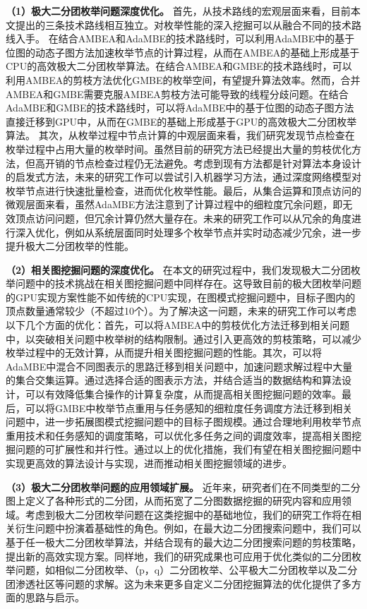 \textbf{（1）极大二分团枚举问题深度优化。} 首先，从技术路线的宏观层面来看，目前本文提出的三条技术路线相互独立。对枚举性能的深入挖掘可以从融合不同的技术路线入手。
在结合AMBEA和AdaMBE的技术路线时，可以利用AdaMBE中的基于位图的动态子图方法加速枚举节点的计算过程，从而在AMBEA的基础上形成基于CPU的高效极大二分团枚举算法。在结合AMBEA和GMBE的技术路线时，可以利用AMBEA的剪枝方法优化GMBE的枚举空间，有望提升算法效率。然而，合并AMBEA和GMBE需要克服AMBEA剪枝方法可能导致的线程分歧问题。在结合AdaMBE和GMBE的技术路线时，可以将AdaMBE中的基于位图的动态子图方法直接迁移到GPU中，从而在GMBE的基础上形成基于GPU的高效极大二分团枚举算法。
其次，从枚举过程中节点计算的中观层面来看，我们研究发现节点检查在枚举过程中占用大量的枚举时间。虽然目前的研究方法已经提出大量的剪枝优化方法，但高开销的节点检查过程仍无法避免。考虑到现有方法都是针对算法本身设计的启发式方法，未来的研究工作可以尝试引入机器学习方法，通过深度网络模型对枚举节点进行快速批量检查，进而优化枚举性能。最后，从集合运算和顶点访问的微观层面来看，虽然AdaMBE方法注意到了计算过程中的细粒度冗余问题，即无效顶点访问问题，但冗余计算仍然大量存在。未来的研究工作可以从冗余的角度进行深入优化，例如从系统层面同时处理多个枚举节点并实时动态减少冗余，进一步提升极大二分团枚举的性能。


\textbf{（2）相关图挖掘问题的深度优化。} 在本文的研究过程中，我们发现极大二分团枚举问题中的技术挑战在相关图挖掘问题中同样存在。这导致目前的极大团枚举问题的GPU实现方案性能不如传统的CPU实现，在图模式挖掘问题中，目标子图内的顶点数量通常较少（不超过10个）。为了解决这一问题，未来的研究工作可以考虑以下几个方面的优化：首先，可以将AMBEA中的剪枝优化方法迁移到相关问题中，以突破相关问题中枚举树的结构限制。通过引入更高效的剪枝策略，可以减少枚举过程中的无效计算，从而提升相关图挖掘问题的性能。其次，可以将AdaMBE中混合不同图表示的思路迁移到相关问题中，加速问题求解过程中大量的集合交集运算。通过选择合适的图表示方法，并结合适当的数据结构和算法设计，可以有效降低集合操作的计算复杂度，从而提高相关图挖掘问题的效率。最后，可以将GMBE中枚举节点重用与任务感知的细粒度任务调度方法迁移到相关问题中，进一步拓展图模式挖掘问题中的目标子图规模。通过合理地利用枚举节点重用技术和任务感知的调度策略，可以优化多任务之间的调度效率，提高相关图挖掘问题的可扩展性和并行性。通过以上的优化措施，我们有望在相关图挖掘问题中实现更高效的算法设计与实现，进而推动相关图挖掘领域的进步。

\textbf{（3）极大二分团枚举问题的应用领域扩展。} 近年来，研究者们在不同类型的二分图上定义了各种形式的二分团，从而拓宽了二分图数据挖掘的研究内容和应用领域。考虑到极大二分团枚举问题在这类挖掘中的基础地位，我们的研究工作将在相关衍生问题中扮演着基础性的角色。例如，在最大边二分团搜索问题中，我们可以基于任一极大二分团枚举算法，并结合现有的最大边二分团搜索问题的剪枝策略，提出新的高效实现方案。同样地，我们的研究成果也可应用于优化类似的二分团枚举问题，如相似二分团枚举、（p，q）二分团枚举、公平极大二分团枚举以及二分团渗透社区等问题的求解。这为未来更多自定义二分团挖掘算法的优化提供了多方面的思路与启示。